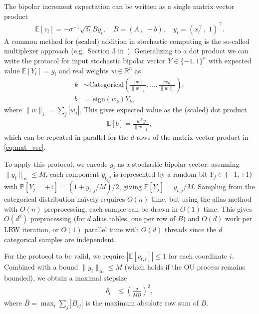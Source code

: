 \documentclass[pra,showpacs,amsmath,amssymb,amsfonts,lengthcheck,longbibliography,onecolumn]{revtex4-2}
\begin{document}
The bipolar increment expectation can be written as a single matrix vector product
\begin{align}
    \mathbb{E}[v_t] = - \sigma^{-1}\sqrt{\delta_t} By_t, \quad
    B = (A \,,\; {-}b), \quad y_t = (x_t^\top \,, \; 1)^\top. \label{eq:mat_vec}
\end{align}
A common method for (scaled) addition in stochastic computing is the so-called multiplexer approach (e.g.\ Section 3 in~\cite{gross2019stochastic}). Generalizing to a dot product we can write the protocol for input stochastic bipolar vector $Y \in \{-1, 1\}^n$ with expected value $\mathbb{E}[Y_i] = y_i$ and real weights $w \in \mathbb{R}^n$ as
\begin{align*}
    k &\sim \text{Categorical}\left(\frac{|w_1|}{\|w\|_1}, \dots, \frac{|w_n|}{\|w\|_1}\right),
    \\
    b &= \text{sign}(w_k) Y_k,
\end{align*}
where $\|w\|_1 = \sum_j |w_j|$. This gives expected value as the (scaled) dot product
\begin{align*}
    \mathbb{E}[b] = \frac{w^\top y}{\|w\|_1},
\end{align*}
which can be repeated in parallel for the $d$ rows of the matrix-vector product in \eqref{eq:mat_vec}.

To apply this protocol, we encode $y_t$ as a stochastic bipolar vector: assuming $\|y_t\|_\infty \leq M$, each component $y_{t,j}$ is represented by a random bit $Y_j \in \{-1, +1\}$ with $\mathbb{P}[Y_j = +1] = (1 + y_{t,j}/M)/2$, giving $\mathbb{E}[Y_j] = y_{t,j}/M$. Sampling from the categorical distribution na\"ively requires $O(n)$ time, but using the alias method~\cite{walker1977efficient} with $O(n)$ preprocessing, each sample can be drawn in $O(1)$ time. This gives $O(d^2)$ preprocessing (for $d$ alias tables, one per row of $B$) and $O(d)$ work per LRW iteration, or $O(1)$ parallel time with $O(d)$ threads since the $d$ categorical samples are independent.

For the protocol to be valid, we require $|\mathbb{E}[v_{t,i}]| \leq 1$ for each coordinate $i$. Combined with a bound $\|y_t\|_\infty \leq M$ (which holds if the OU process remains bounded), we obtain a maximal stepsize
\begin{align*}
    \delta_t &\leq \left(\frac{\sigma}{M\bar{B}}\right)^2,
\end{align*}
where $\bar{B} = \max_i \sum_j |B_{ij}|$ is the maximum absolute row sum of $B$.
\end{document}
